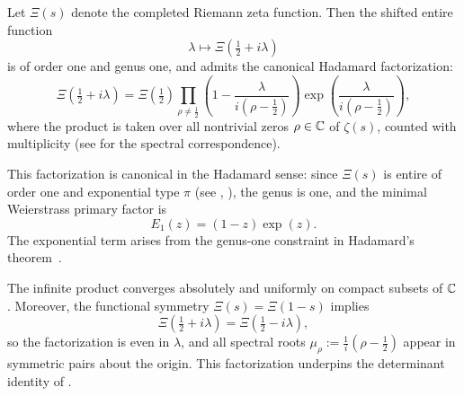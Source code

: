 \begin{lemma}
\label{lem:hadamard_linear_form}
Let \( \Xi(s) \) denote the completed Riemann zeta function. Then the shifted entire function
\[
\lambda \mapsto \Xi\left( \tfrac{1}{2} + i\lambda \right)
\]
is of order one and genus one, and admits the canonical Hadamard factorization:
\[
\Xi\left( \tfrac{1}{2} + i\lambda \right)
= \Xi\left( \tfrac{1}{2} \right)
\prod_{\rho \ne \frac{1}{2}} \left( 1 - \frac{\lambda}{i(\rho - \frac{1}{2})} \right)
\exp\left( \frac{\lambda}{i(\rho - \frac{1}{2})} \right),
\]
where the product is taken over all nontrivial zeros \( \rho \in \mathbb{C} \) of \( \zeta(s) \), counted with multiplicity (see  for the spectral correspondence).

\medskip
\noindent
This factorization is canonical in the Hadamard sense: since \( \Xi(s) \) is entire of order one and exponential type \( \pi \) (see , ), the genus is one, and the minimal Weierstrass primary factor is
\[
E_1(z) = (1 - z)\exp(z).
\]
The exponential term arises from the genus-one constraint in Hadamard’s theorem~\cite[Ch.~9]{Levin1996EntireLectures}.

\medskip
\noindent
The infinite product converges absolutely and uniformly on compact subsets of \( \mathbb{C} \). Moreover, the functional symmetry \( \Xi(s) = \Xi(1 - s) \) implies
\[
\Xi\left( \tfrac{1}{2} + i\lambda \right) = \Xi\left( \tfrac{1}{2} - i\lambda \right),
\]
so the factorization is even in \( \lambda \), and all spectral roots \( \mu_\rho := \tfrac{1}{i}(\rho - \tfrac{1}{2}) \) appear in symmetric pairs about the origin. This factorization underpins the determinant identity of .
\end{lemma}
